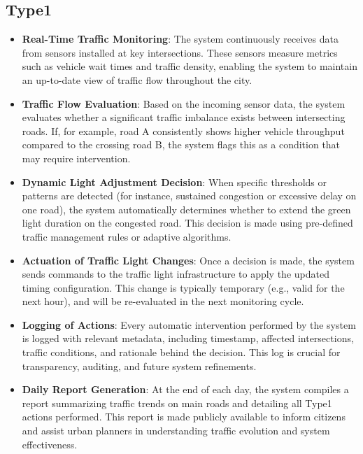 \documentclass[a4paper,12pt]{article}
\begin{document}
\subsection*{Type1}
\begin{itemize}
    \item \textbf{Real-Time Traffic Monitoring}: The system continuously receives data from sensors installed at key intersections. These sensors measure metrics such as vehicle wait times and traffic density, enabling the system to maintain an up-to-date view of traffic flow throughout the city.
    \item \textbf{Traffic Flow Evaluation}: Based on the incoming sensor data, the system evaluates whether a significant traffic imbalance exists between intersecting roads. If, for example, road A consistently shows higher vehicle throughput compared to the crossing road B, the system flags this as a condition that may require intervention.
    \item \textbf{Dynamic Light Adjustment Decision}: When specific thresholds or patterns are detected (for instance, sustained congestion or excessive delay on one road), the system automatically determines whether to extend the green light duration on the congested road. This decision is made using pre-defined traffic management rules or adaptive algorithms.
    \item \textbf{Actuation of Traffic Light Changes}: Once a decision is made, the system sends commands to the traffic light infrastructure to apply the updated timing configuration. This change is typically temporary (e.g., valid for the next hour), and will be re-evaluated in the next monitoring cycle.

    \item \textbf{Logging of Actions}: Every automatic intervention performed by the system is logged with relevant metadata, including timestamp, affected intersections, traffic conditions, and rationale behind the decision. This log is crucial for transparency, auditing, and future system refinements.

    \item \textbf{Daily Report Generation}: At the end of each day, the system compiles a report summarizing traffic trends on main roads and detailing all Type1 actions performed. This report is made publicly available to inform citizens and assist urban planners in understanding traffic evolution and system effectiveness.
\end{itemize}

\newpage
\end{document}
